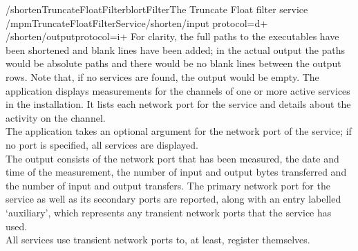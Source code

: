 /shorten\pseudotab{}TruncateFloatFilter\pseudotab{}blort\pseudotab{}Filter\pseudotab{}The
Truncate Float filter service\pseudothreetabs\\
\textellipsis{}/mpmTruncateFloatFilterService\pseudotab{}/shorten/input\textbraceleft{}%
protocol=d+\textbraceright\pseudotab\\
/shorten/output\textbraceleft{}protocol=i+\textbraceright
\outputEnd{}
For clarity, the full paths to the executables have been shortened and blank lines have
been added; in the actual output the paths would be absolute paths and there would be no
blank lines between the output rows.
Note that, if no services are found, the output would be empty.
\condPage
{}
The application  displays measurements for the channels of
one or more active services in the \mplusm{} installation.
It lists each \yarp{} network port for the service and details about the activity on the
channel.\\

The application takes an optional argument for the \yarp{} network port of the service;
if no port is specified, all services are displayed.
\insertFullUtilityParameters\\

The output consists of the \yarp{} network port that has been measured, the date and time
of the measurement, the number of input and output bytes transferred and the number of
input and output transfers.
The primary \yarp{} network port for the service as well as its secondary ports are
reported, along with an entry labelled `auxiliary', which represents any transient
\yarp{} network ports that the service has used.\\

All services use transient \yarp{} network ports to, at least, register themselves.\\


